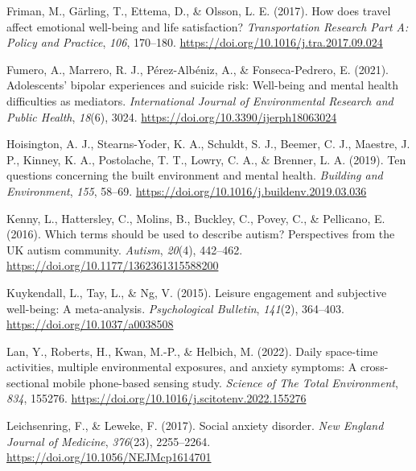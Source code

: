 \documentclass[
  letterpaper,
  number,
  review,
  3p]{elsarticle}
\newlength{\cslhangindent}
\newenvironment{CSLReferences}[2] %
 {\begin{list}{}{%
  \setlength{\itemindent}{0pt}
  \setlength{\leftmargin}{0pt}
  \setlength{\parsep}{0pt}
  \ifodd #1
   \setlength{\leftmargin}{\cslhangindent}
   \setlength{\itemindent}{-1\cslhangindent}
  \fi
  \setlength{\itemsep}{#2\baselineskip}}}
 {\end{list}}
\begin{document}
\begin{CSLReferences}{1}{0}
Friman, M., Gärling, T., Ettema, D., \& Olsson, L. E. (2017). How does
travel affect emotional well-being and life satisfaction?
\emph{Transportation Research Part A: Policy and Practice}, \emph{106},
170--180. \url{https://doi.org/10.1016/j.tra.2017.09.024}

Fumero, A., Marrero, R. J., Pérez-Albéniz, A., \& Fonseca-Pedrero, E.
(2021). Adolescents' bipolar experiences and suicide risk: {Well-being}
and mental health difficulties as mediators. \emph{International Journal
of Environmental Research and Public Health}, \emph{18}(6), 3024.
\url{https://doi.org/10.3390/ijerph18063024}

Hoisington, A. J., Stearns-Yoder, K. A., Schuldt, S. J., Beemer, C. J.,
Maestre, J. P., Kinney, K. A., Postolache, T. T., Lowry, C. A., \&
Brenner, L. A. (2019). Ten questions concerning the built environment
and mental health. \emph{Building and Environment}, \emph{155}, 58--69.
\url{https://doi.org/10.1016/j.buildenv.2019.03.036}

Kenny, L., Hattersley, C., Molins, B., Buckley, C., Povey, C., \&
Pellicano, E. (2016). Which terms should be used to describe autism?
{Perspectives} from the {UK} autism community. \emph{Autism},
\emph{20}(4), 442--462. \url{https://doi.org/10.1177/1362361315588200}

Kuykendall, L., Tay, L., \& Ng, V. (2015). Leisure engagement and
subjective well-being: {A} meta-analysis. \emph{Psychological Bulletin},
\emph{141}(2), 364--403. \url{https://doi.org/10.1037/a0038508}

Lan, Y., Roberts, H., Kwan, M.-P., \& Helbich, M. (2022). Daily
space-time activities, multiple environmental exposures, and anxiety
symptoms: {A} cross-sectional mobile phone-based sensing study.
\emph{Science of The Total Environment}, \emph{834}, 155276.
\url{https://doi.org/10.1016/j.scitotenv.2022.155276}

Leichsenring, F., \& Leweke, F. (2017). Social anxiety disorder.
\emph{New England Journal of Medicine}, \emph{376}(23), 2255--2264.
\url{https://doi.org/10.1056/NEJMcp1614701}


\end{CSLReferences}
\end{document}

